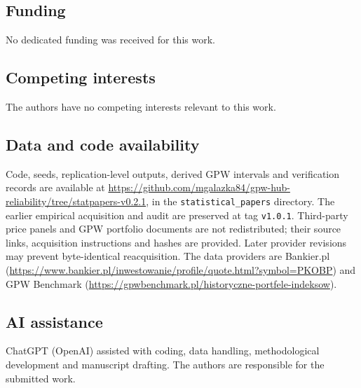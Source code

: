 \documentclass[pdflatex,sn-mathphys-ay]{sn-jnl}
\theoremstyle{thmstyleone}
\theoremstyle{thmstyletwo}
\begin{document}
\subsection*{Funding}
No dedicated funding was received for this work.
\subsection*{Competing interests}
The authors have no competing interests relevant to this work.
\subsection*{Data and code availability}
Code, seeds, replication-level outputs, derived GPW intervals and verification records are available at \url{https://github.com/mgalazka84/gpw-hub-reliability/tree/statpapers-v0.2.1}, in the \texttt{statistical\_papers} directory. The earlier empirical acquisition and audit are preserved at tag \texttt{v1.0.1}. Third-party price panels and GPW portfolio documents are not redistributed; their source links, acquisition instructions and hashes are provided. Later provider revisions may prevent byte-identical reacquisition. The data providers are Bankier.pl (\url{https://www.bankier.pl/inwestowanie/profile/quote.html?symbol=PKOBP}) and GPW Benchmark (\url{https://gpwbenchmark.pl/historyczne-portfele-indeksow}).
\subsection*{AI assistance}
ChatGPT (OpenAI) assisted with coding, data handling, methodological development and manuscript drafting. The authors are responsible for the submitted work.

\nocite{*}

\end{document}
